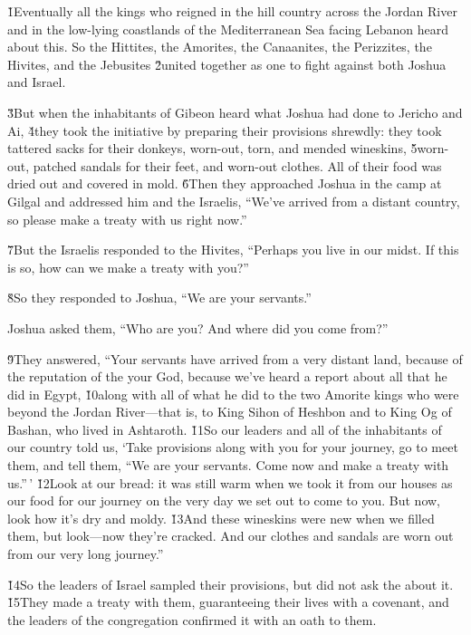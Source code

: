 \v{1}Eventually all the kings who reigned in the hill country across the Jordan River and in the low-lying coastlands of the Mediterranean Sea facing Lebanon heard about this. So the Hittites, the Amorites, the Canaanites, the Perizzites, the Hivites, and the Jebusites \v{2}united together as one to fight against both Joshua and Israel.

\v{3}But when the inhabitants of Gibeon heard what Joshua had done to Jericho and Ai, \v{4}they took the initiative by preparing their provisions shrewdly: they took tattered sacks for their donkeys, worn-out, torn, and mended wineskins, \v{5}worn-out, patched sandals for their feet, and worn-out clothes. All of their food was dried out and covered in mold. \v{6}Then they approached Joshua in the camp at Gilgal and addressed him and the Israelis, ``We've arrived from a distant country, so please make a treaty with us right now.''

\v{7}But the Israelis responded to the Hivites, ``Perhaps you live in our midst. If this is so, how can we make a treaty with you?''

\v{8}So they responded to Joshua, ``We are your servants.''

Joshua asked them, ``Who are you? And where did you come from?''

\v{9}They answered, ``Your servants have arrived from a very distant land, because of the reputation of the  your God, because we've heard a report about all that he did in Egypt, \v{10}along with all of what he did to the two Amorite kings who were beyond the Jordan River---that is, to King Sihon of Heshbon and to King Og of Bashan, who lived in Ashtaroth. \v{11}So our leaders and all of the inhabitants of our country told us, `Take provisions along with you for your journey, go to meet them, and tell them, ``We are your servants. Come now and make a treaty with us.''\,' \v{12}Look at our bread: it was still warm when we took it from our houses as our food for our journey on the very day we set out to come to you. But now, look how it's dry and moldy. \v{13}And these wineskins were new when we filled them, but look---now they're cracked. And our clothes and sandals are worn out from our very long journey.''

\v{14}So the leaders of Israel sampled their provisions, but did not ask the  about it. \v{15}They made a treaty with them, guaranteeing their lives with a covenant, and the leaders of the congregation confirmed it with an oath to them.

